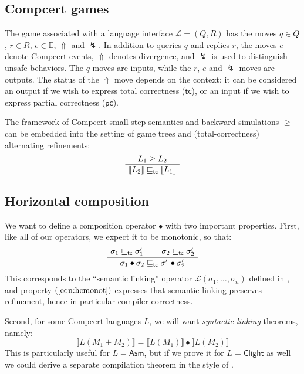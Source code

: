 \documentclass[11pt]{article}
\newcommand{\kw}[1]{{\mathsf{#1}}}
\begin{document}
\subsection{Compcert games}

The game associated with a language interface $\mathcal{L} = (Q, R)$
has the moves
$q \in Q$, $r \in R$, $e \in \mathbb{E}$, $\Uparrow$ and $\lightning$.
In addition to queries $q$ and replies $r$,
the moves $e$ denote Compcert events,
$\Uparrow$ denotes divergence,
and $\lightning$ is used to distinguish unsafe behaviors.
The $q$ moves are inputs,
while the $r$, $e$ and $\lightning$ moves are outputs.
The status of the $\Uparrow$ move depends on the context:
it can be considered
an output if we wish to express total correctness ($\kw{tc}$), or
an input if we wish to express partial correctness ($\kw{pc}$).

The framework of
Compcert small-step semantics and backward simulations $\ge$
can be embedded into
the setting of game trees and (total-correctness) alternating refinements:
\begin{equation}
  \AxiomC{$L_1 \ge L_2$}
  \UnaryInfC{$\llbracket L_2 \rrbracket \sqsubseteq_\kw{tc} \llbracket L_1 \rrbracket$}
  \DisplayProof
  \label{eqn:embed}
\end{equation}

\subsection{Horizontal composition}

We want to define a composition operator $\bullet$
with two important properties.
First, like all of our operators,
we expect it to be monotonic, so that:
\begin{equation}
  \AxiomC{$\sigma_1 \sqsubseteq_\kw{tc} \sigma_1'$}
  \AxiomC{$\sigma_2 \sqsubseteq_\kw{tc} \sigma_2'$}
  \BinaryInfC{$\sigma_1 \bullet \sigma_2 \sqsubseteq_\kw{tc}
                \sigma_1' \bullet \sigma_2'$}
  \DisplayProof
  \label{eqn:hcmonot}
\end{equation}
This corresponds to the ``semantic linking'' operator
$\mathcal{L}(\sigma_1, \ldots, \sigma_n)$
defined in \cite{compcompcert},
and property $(\ref{eqn:hcmonot})$
expresses that semantic linking preserves refinement,
hence in particular compiler correctness.

Second,
for some Compcert languages $L$,
we will want \emph{syntactic linking} theorems,
namely:
\begin{equation}
  \llbracket L(M_1 + M_2) \rrbracket =
  \llbracket L(M_1) \rrbracket \bullet
  \llbracket L(M_2) \rrbracket
  \label{eqn:slink}
\end{equation}
This is particularly useful for $L = \kw{Asm}$,
but if we prove it for $L = \kw{Clight}$ as well
we could derive a separate compilation theorem
in the style of \cite{sepcompcert}.
\end{document}

